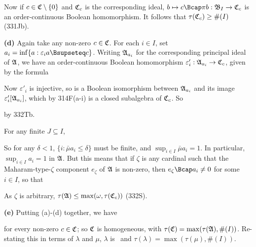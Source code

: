{Now if $c\in\frak C\setminus\{0\}$ and $\frak C_c$ is the corresponding
ideal, $b\mapsto c\Bcap\pi b:\frak B_I\to\frak C_c$ is an
order-continuous Boolean homomorphism.   It follows that
$\tau(\frak C_c)\ge\#(I)$ (331Jb).

\medskip

{\bf (d)} Again take any non-zero $c\in\frak C$.   For each $i\in I$,
set $a_i=\inf\{a:\varepsilon_ia\Bsupseteq c\}$.
Writing $\frak A_{a_i}$ for
the corresponding principal ideal of $\frak A$, we have an
order-continuous Boolean homomorphism
$\varepsilon'_i:\frak A_{a_i}\to\frak C_c$, given by the formula


\noindent Now $\varepsilon'_i$ is injective, so is a Boolean isomorphism
between $\frak A_{a_i}$ and its image $\varepsilon'_i[\frak A_{a_i}]$,
which by 314F(a-i) is a closed subalgebra of $\frak C_c$.   So


\noindent by 332Tb.

For any finite $J\subseteq I$,


\noindent So for any $\delta<1$, $\{i:\bar\mu a_i\le\delta\}$ must be
finite, and $\sup_{i\in I}\bar\mu a_i=1$.   In particular,
$\sup_{i\in I}a_i=1$ in $\frak A$.   But this means that if $\zeta$ is
any cardinal
such that the Maharam-type-$\zeta$ component $e_{\zeta}$ of $\frak A$ is
non-zero, then $e_{\zeta}\Bcap a_i\ne 0$ for some $i\in I$, so that


\noindent As $\zeta$ is arbitrary,
$\tau(\frak A)\le\max(\omega,\tau(\frak C_c))$ (332S).

\medskip

{\bf (e)} Putting (a)-(d) together, we have


\noindent for every non-zero $c\in\frak C$;  so $\frak C$ is
homogeneous, with $\tau(\frak C)=\max(\tau(\frak A),\#(I))$.   
Re-stating this in terms of $\lambda$ and $\mu$, $\lambda$ is \Mth\
and $\tau(\lambda)=\max(\tau(\mu),\#(I))$.
}%

